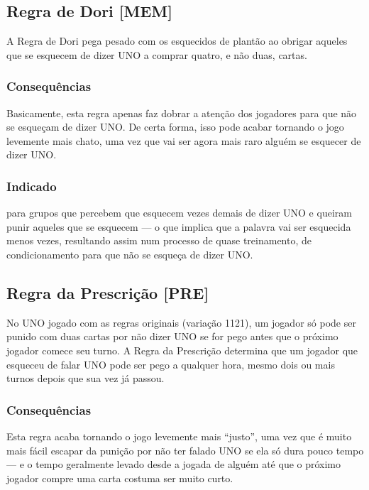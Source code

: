 \subsection{Regra de Dori [MEM]}

A Regra de Dori pega pesado com os esquecidos de plantão ao obrigar aqueles que se esquecem de dizer UNO a comprar quatro, e não duas, cartas.

\subsubsection{Consequências}

Basicamente, esta regra apenas faz dobrar a atenção dos jogadores para que não se esqueçam de dizer UNO. De certa forma, isso pode acabar tornando o jogo levemente mais chato, uma vez que vai ser agora mais raro alguém se esquecer de dizer UNO. 

\subsubsection{Indicado} 

para grupos que percebem que esquecem vezes demais de dizer UNO e queiram punir aqueles que se esquecem --- o que implica que a palavra vai ser esquecida menos vezes, resultando assim num processo de quase treinamento, de condicionamento para que não se esqueça de dizer UNO.

\subsection{Regra da Prescrição [PRE]}

No UNO jogado com as regras originais (variação 1121), um jogador só pode ser punido com duas cartas por não dizer UNO se for pego antes que o próximo jogador comece seu turno. A Regra da Prescrição determina que um jogador que esqueceu de falar UNO pode ser pego a qualquer hora, mesmo dois ou mais turnos depois que sua vez já passou.

\subsubsection{Consequências}

Esta regra acaba tornando o jogo levemente mais ``justo'', uma vez que é muito mais fácil escapar da punição por não ter falado UNO se ela só dura pouco tempo --- e o tempo geralmente levado desde a jogada de alguém até que o próximo jogador compre uma carta costuma ser muito curto.

